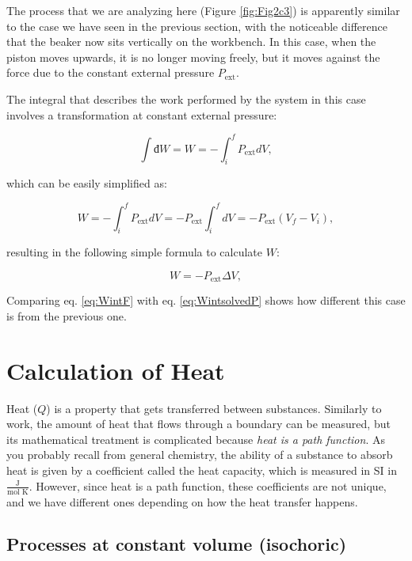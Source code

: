 \documentclass[
]{book}
\theoremstyle{definition}
\theoremstyle{definition}
\theoremstyle{definition}
\theoremstyle{remark}
\begin{document}
The process that we are analyzing here (Figure \ref{fig:Fig2c3}) is apparently similar to the case we have seen in the previous section, with the noticeable difference that the beaker now sits vertically on the workbench. In this case, when the piston moves upwards, it is no longer moving freely, but it moves against the force due to the constant external pressure \(P_{\text{ext}}\).

The integral that describes the work performed by the system in this case involves a transformation at constant external pressure:

\begin{equation}
  \int đ W = W = - \int_{i}^{f} P_{\text{ext}}dV,
  \label{eq:Wint2}
\end{equation}

which can be easily simplified as:

\begin{equation}
  W = - \int_{i}^{f} P_{\text{ext}}dV = -P_{\text{ext}} \int_{i}^{f} dV = -P_{\text{ext}} (V_f-V_i),
  \label{eq:Wint3}
\end{equation}

resulting in the following simple formula to calculate \(W\):

\begin{equation}
  W = -P_{\text{ext}} \Delta V,
  \label{eq:WintF}
\end{equation}

Comparing eq. \eqref{eq:WintF} with eq. \eqref{eq:WintsolvedP} shows how different this case is from the previous one.

\hypertarget{heatint}{%
\section{Calculation of Heat}\label{heatint}}

Heat (\(Q\)) is a property that gets transferred between substances. Similarly to work, the amount of heat that flows through a boundary can be measured, but its mathematical treatment is complicated because \emph{heat is a path function}.
As you probably recall from general chemistry, the ability of a substance to absorb heat is given by a coefficient called the heat capacity, which is measured in SI in \(\frac{\text{J}}{\text{mol K}}\). However, since heat is a path function, these coefficients are not unique, and we have different ones depending on how the heat transfer happens.

\hypertarget{processes-at-constant-volume-isochoric}{%
\subsection{Processes at constant volume (isochoric)}\label{processes-at-constant-volume-isochoric}}
\end{document}
